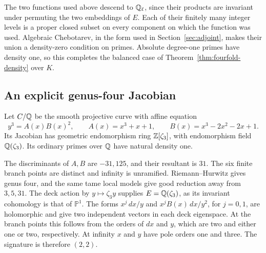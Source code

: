 The two functions used above descend to \(\mathbb Q_\ell\), since their
products are invariant under permuting the two embeddings of \(E\).
Each of their finitely many integer levels is a proper closed subset
on every component on which the function was used. Algebraic
Chebotarev, in the form used in Section~\ref{sec:adjoint}, makes their
union a density-zero condition on primes. Absolute degree-one primes
have density one, so this completes the balanced case of
Theorem~\ref{thm:fourfold-density} over \(K\).

\subsection{An explicit genus-four Jacobian}

\begin{example}\label{ex:fourfold-curve}
Let \(C/\mathbb Q\) be the smooth projective curve with affine equation
\[
 y^3=A(x)B(x)^2,
 \qquad A(x)=x^3+x+1,\qquad B(x)=x^3-2x^2-2x+1.
\]
Its Jacobian has geometric endomorphism ring \(\mathbb Z[\zeta_3]\), with
endomorphism field \(\mathbb Q(\zeta_3)\). Its ordinary primes over \(\mathbb Q\)
have natural density one.
\end{example}

The discriminants of \(A,B\) are \(-31,125\), and their resultant is
\(31\). The six finite branch points are distinct and infinity is
unramified. Riemann--Hurwitz gives genus four, and the same tame
local models give good reduction away from \(3,5,31\). The deck
action by \(y\mapsto\zeta_3y\) supplies \(E=\mathbb Q(\zeta_3)\), as its
invariant cohomology is that of \(\mathbb P^1\). The forms
\(x^j\,dx/y\) and \(x^j B(x)\,dx/y^2\), for \(j=0,1\), are
holomorphic and give two independent vectors in each deck
eigenspace. At the branch points this follows from the orders of
\(dx\) and \(y\), which are two and either one or two, respectively.
At infinity \(x\) and \(y\) have pole orders one and three. The
signature is therefore \((2,2)\).

